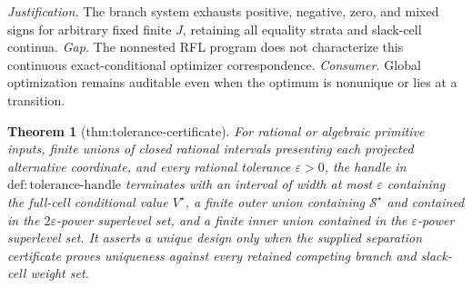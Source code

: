 \documentclass{article}
\newtheorem{theorem}{Theorem}
\begin{document}
\par\smallskip\noindent \textit{Justification.} The branch system exhausts positive, negative, zero, and mixed signs for arbitrary fixed finite \(J\), retaining all equality strata and slack-cell continua. \textit{Gap.} The nonnested RFL program does not characterize this continuous exact-conditional optimizer correspondence. \textit{Consumer.} Global optimization remains auditable even when the optimum is nonunique or lies at a transition.

\begin{theorem}[thm:tolerance-certificate]\label{thm:tolerance-certificate}
For rational or algebraic primitive inputs, finite unions of closed rational intervals presenting each projected alternative coordinate, and every rational tolerance \(\varepsilon>0\), the handle in \(\mathrm{def{:}tolerance\mbox{-}handle}\) terminates with an interval of width at most \(\varepsilon\) containing the full-cell conditional value \(V^{\star}\), a finite outer union containing \(\mathcal{S}^{\star}\) and contained in the \(2\varepsilon\)-power superlevel set, and a finite inner union contained in the \(\varepsilon\)-power superlevel set. It asserts a unique design only when the supplied separation certificate proves uniqueness against every retained competing branch and slack-cell weight set.
\end{theorem}
\end{document}
